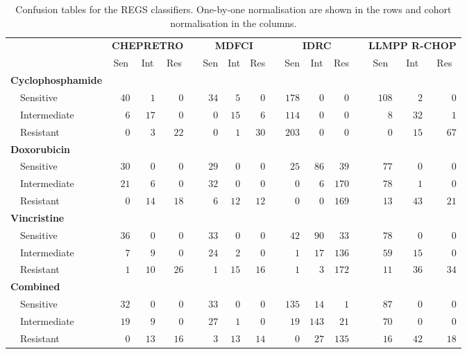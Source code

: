 \begin{table}[!tbp]
{\small
\caption{Confusion tables for the REGS classifiers.
One-by-one normalisation are shown in the rows and cohort normalisation in the
columns.\label{tab:confusiondrugonebyone}} 
\begin{center}
\begin{tabular}{lrrrcrrrcrrrcrrr}
\hline\hline
\multicolumn{1}{l}{\bfseries }&\multicolumn{3}{c}{\bfseries CHEPRETRO}&\multicolumn{1}{c}{\bfseries }&\multicolumn{3}{c}{\bfseries MDFCI}&\multicolumn{1}{c}{\bfseries }&\multicolumn{3}{c}{\bfseries IDRC}&\multicolumn{1}{c}{\bfseries }&\multicolumn{3}{c}{\bfseries LLMPP R-CHOP}\tabularnewline
\cline{2-4} \cline{6-8} \cline{10-12} \cline{14-16}
\multicolumn{1}{l}{}&\multicolumn{1}{c}{Sen}&\multicolumn{1}{c}{Int}&\multicolumn{1}{c}{Res}&\multicolumn{1}{c}{}&\multicolumn{1}{c}{Sen}&\multicolumn{1}{c}{Int}&\multicolumn{1}{c}{Res}&\multicolumn{1}{c}{}&\multicolumn{1}{c}{Sen}&\multicolumn{1}{c}{Int}&\multicolumn{1}{c}{Res}&\multicolumn{1}{c}{}&\multicolumn{1}{c}{Sen}&\multicolumn{1}{c}{Int}&\multicolumn{1}{c}{Res}\tabularnewline
\hline
{\bfseries Cyclophosphamide}&&&&&&&&&&&&&&&\tabularnewline
~~Sensitive&$40$&$ 1$&$ 0$&&$34$&$ 5$&$ 0$&&$178$&$  0$&$  0$&&$108$&$ 2$&$ 0$\tabularnewline
~~Intermediate&$ 6$&$17$&$ 0$&&$ 0$&$15$&$ 6$&&$114$&$  0$&$  0$&&$  8$&$32$&$ 1$\tabularnewline
~~Resistant&$ 0$&$ 3$&$22$&&$ 0$&$ 1$&$30$&&$203$&$  0$&$  0$&&$  0$&$15$&$67$\tabularnewline
\hline
{\bfseries Doxorubicin}&&&&&&&&&&&&&&&\tabularnewline
~~Sensitive&$30$&$ 0$&$ 0$&&$29$&$ 0$&$ 0$&&$ 25$&$ 86$&$ 39$&&$ 77$&$ 0$&$ 0$\tabularnewline
~~Intermediate&$21$&$ 6$&$ 0$&&$32$&$ 0$&$ 0$&&$  0$&$  6$&$170$&&$ 78$&$ 1$&$ 0$\tabularnewline
~~Resistant&$ 0$&$14$&$18$&&$ 6$&$12$&$12$&&$  0$&$  0$&$169$&&$ 13$&$43$&$21$\tabularnewline
\hline
{\bfseries Vincristine}&&&&&&&&&&&&&&&\tabularnewline
~~Sensitive&$36$&$ 0$&$ 0$&&$33$&$ 0$&$ 0$&&$ 42$&$ 90$&$ 33$&&$ 78$&$ 0$&$ 0$\tabularnewline
~~Intermediate&$ 7$&$ 9$&$ 0$&&$24$&$ 2$&$ 0$&&$  1$&$ 17$&$136$&&$ 59$&$15$&$ 0$\tabularnewline
~~Resistant&$ 1$&$10$&$26$&&$ 1$&$15$&$16$&&$  1$&$  3$&$172$&&$ 11$&$36$&$34$\tabularnewline
\hline
{\bfseries Combined}&&&&&&&&&&&&&&&\tabularnewline
~~Sensitive&$32$&$ 0$&$ 0$&&$33$&$ 0$&$ 0$&&$135$&$ 14$&$  1$&&$ 87$&$ 0$&$ 0$\tabularnewline
~~Intermediate&$19$&$ 9$&$ 0$&&$27$&$ 1$&$ 0$&&$ 19$&$143$&$ 21$&&$ 70$&$ 0$&$ 0$\tabularnewline
~~Resistant&$ 0$&$13$&$16$&&$ 3$&$13$&$14$&&$  0$&$ 27$&$135$&&$ 16$&$42$&$18$\tabularnewline
\hline
\end{tabular}\end{center}}

\end{table}
